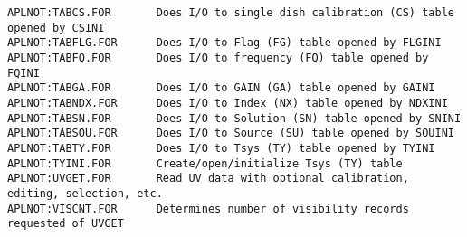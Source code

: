 \begin{verbatim}
APLNOT:TABCS.FOR       Does I/O to single dish calibration (CS) table opened by CSINI
APLNOT:TABFLG.FOR      Does I/O to Flag (FG) table opened by FLGINI
APLNOT:TABFQ.FOR       Does I/O to frequency (FQ) table opened by FQINI
APLNOT:TABGA.FOR       Does I/O to GAIN (GA) table opened by GAINI
APLNOT:TABNDX.FOR      Does I/O to Index (NX) table opened by NDXINI
APLNOT:TABSN.FOR       Does I/O to Solution (SN) table opened by SNINI
APLNOT:TABSOU.FOR      Does I/O to Source (SU) table opened by SOUINI
APLNOT:TABTY.FOR       Does I/O to Tsys (TY) table opened by TYINI
APLNOT:TYINI.FOR       Create/open/initialize Tsys (TY) table
APLNOT:UVGET.FOR       Read UV data with optional calibration, editing, selection, etc.
APLNOT:VISCNT.FOR      Determines number of visibility records requested of UVGET
\end{verbatim}
 
